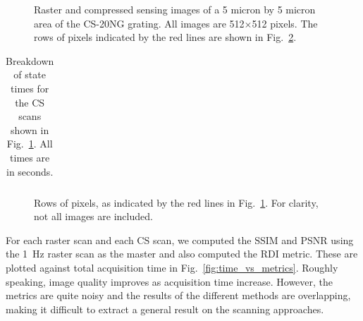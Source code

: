 \documentclass[journal]{IEEEtran}
\begin{document}
\begin{figure}
  \parbox{.1\textwidth}{\phantom{p}}
  \begin{subfigure}{.8\textwidth}
  
\end{subfigure}
\begin{subfigure}[t]{.09\textwidth}
  \vspace{-18.2em}
    
  \end{subfigure}
  \caption{Raster and compressed sensing images of a 5 micron by 5 micron 
    area of the CS-20NG grating. All images are 512$\times$512 pixels.
    The rows of pixels indicated by the red lines are
    shown in Fig.~\ref{fig:pixel_rows}.}
  \label{fig:resultsF1_images}
\end{figure}

\begin{table}[t!]
  \centering
  \caption{Breakdown of state times for the CS scans shown in
    Fig.~\ref{fig:resultsF1_images}. All times are in seconds.}
  \label{tab:final_state_times}
  \begin{tabular}{ccccccc}
    
  \end{tabular}
\end{table}

\begin{figure}
  
  \caption{Rows of pixels, as indicated by the red lines in
    Fig.~\ref{fig:resultsF1_images}. For clarity, not all images are
    included.}
  \label{fig:pixel_rows}
\end{figure}
For each raster scan and each CS scan, we computed the SSIM and PSNR
using the 1~Hz raster scan as the master and also computed the RDI
metric. These are plotted against total acquisition time in
Fig.~\ref{fig:time_vs_metrics}. Roughly speaking, image quality improves as
acquisition time increase. However, the metrics are quite noisy and the results of the different methods are overlapping, making it difficult to extract a general result on the scanning approaches. 

\end{document}
